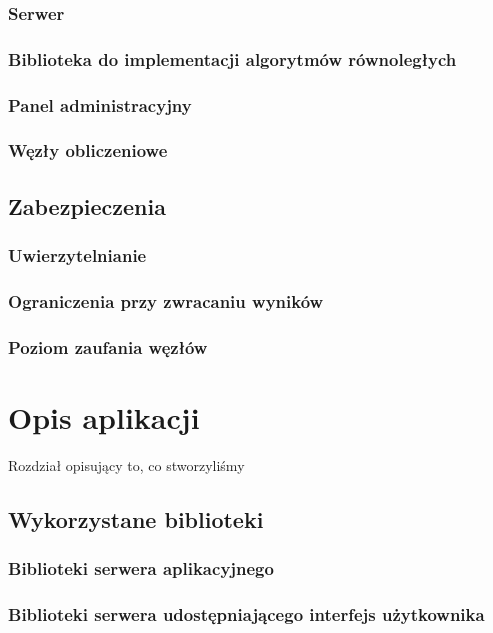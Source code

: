 \documentclass[a4paper,11pt,twoside]{report}
\theoremstyle{definition}
\begin{document}
        \subsection{Serwer}
        \subsection{Biblioteka do implementacji algorytmów równoległych}
        \subsection{Panel administracyjny}
        \subsection{Węzły obliczeniowe}
    
    \section{Zabezpieczenia}
        \subsection{Uwierzytelnianie}
        \subsection{Ograniczenia przy zwracaniu wyników}
        \subsection{Poziom zaufania węzłów}

\chapter{Opis aplikacji}
    Rozdział opisujący to, co stworzyliśmy
    
    \section{Wykorzystane biblioteki}
        \subsection{Biblioteki serwera aplikacyjnego}
        \subsection{Biblioteki serwera udostępniającego interfejs użytkownika}
    
\end{document}
